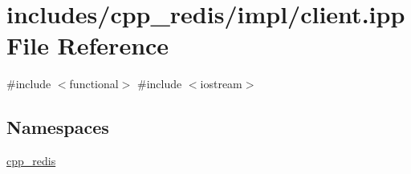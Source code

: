 \hypertarget{client_8ipp}{}\section{includes/cpp\+\_\+redis/impl/client.ipp File Reference}
\label{client_8ipp}
{\ttfamily \#include $<$functional$>$}\newline
{\ttfamily \#include $<$iostream$>$}\newline
\subsection*{Namespaces}
\begin{DoxyCompactItemize}
\item 
 \hyperlink{namespacecpp__redis}{cpp\+\_\+redis}
\end{DoxyCompactItemize}
